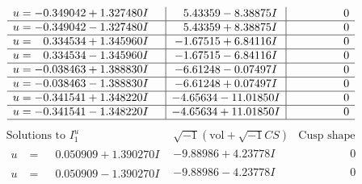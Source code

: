 \documentclass[1p]{elsarticle_modified}
\theoremstyle{definition}
\newcommand{\I}{\sqrt{-1}}
\begin{document}
$$\begin{array}{c|c|c}
\begin{aligned}
u &= -0.349042 + 1.327480 I\end{aligned}
 & \phantom{-}5.43359 - 8.38875 I & \phantom{-0.000000 } 0 \\ \hline\begin{aligned}
u &= -0.349042 - 1.327480 I\end{aligned}
 & \phantom{-}5.43359 + 8.38875 I & \phantom{-0.000000 } 0 \\ \hline\begin{aligned}
u &= \phantom{-}0.334534 + 1.345960 I\end{aligned}
 & -1.67515 + 6.84116 I & \phantom{-0.000000 } 0 \\ \hline\begin{aligned}
u &= \phantom{-}0.334534 - 1.345960 I\end{aligned}
 & -1.67515 - 6.84116 I & \phantom{-0.000000 } 0 \\ \hline\begin{aligned}
u &= -0.038463 + 1.388830 I\end{aligned}
 & -6.61248 - 0.07497 I & \phantom{-0.000000 } 0 \\ \hline\begin{aligned}
u &= -0.038463 - 1.388830 I\end{aligned}
 & -6.61248 + 0.07497 I & \phantom{-0.000000 } 0 \\ \hline\begin{aligned}
u &= -0.341541 + 1.348220 I\end{aligned}
 & -4.65634 - 11.01850 I & \phantom{-0.000000 } 0 \\ \hline\begin{aligned}
u &= -0.341541 - 1.348220 I\end{aligned}
 & -4.65634 + 11.01850 I & \phantom{-0.000000 } 0\\
 \hline 
 \end{array}$$\newpage$$\begin{array}{c|c|c}  
\text{Solutions to }I^u_{1}& \I (\text{vol} + \sqrt{-1}CS) & \text{Cusp shape}\\
 \hline 
\begin{aligned}
u &= \phantom{-}0.050909 + 1.390270 I\end{aligned}
 & -9.88986 + 4.23778 I & \phantom{-0.000000 } 0 \\ \hline\begin{aligned}
u &= \phantom{-}0.050909 - 1.390270 I\end{aligned}
 & -9.88986 - 4.23778 I & \phantom{-0.000000 } 0 \\ \hline\begin{aligned}

\end{aligned}
\end{array}$$
\end{document}
